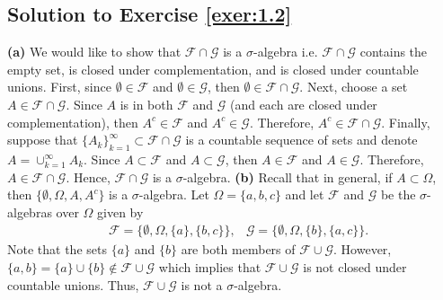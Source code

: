 \documentclass[12pt]{book}
\numberwithin{equation}{chapter}
\theoremstyle{plain}
\numberwithin{theorem}{section}
\theoremstyle{definition}
\numberwithin{exercise}{chapter}
\newcommand{\<}{\langle}
\renewcommand{\>}{\rangle}
\renewcommand{\(}{\left(}
\renewcommand{\)}{\right)}
\renewcommand{\[}{\left[}
\renewcommand{\]}{\right]}
\newcommand\Fc{\mathscr{F}}
\newcommand\Gc{\mathscr{G}}
\newcommand\Om{\Omega}
\newcommand\sig{\sigma}
\newcommand\es{\emptyset}
\begin{document}
\subsection*{Solution to Exercise \ref{exer:1.2}}
\textbf{(a)}
We would like to show that $\Fc \cap \Gc$ is a $\sig$-algebra i.e. $\Fc \cap \Gc$ contains the empty set, is closed under complementation, and is closed under countable unions. First, since $\emptyset \in \Fc$ and $\emptyset \in \Gc$, then $\emptyset \in \Fc \cap \Gc$. Next, choose a set $A \in \Fc \cap \Gc$. Since $A$ is in both $\Fc$ and $\Gc$ (and each are closed under complementation), then $A^c \in \Fc$ and $A^c \in \Gc$. Therefore, $A^c \in \Fc \cap \Gc$. Finally, suppose that $\{ A_k \}_{k=1}^\infty \subset \Fc \cap \Gc$ is a countable sequence of sets and denote $A = \cup_{k=1}^\infty A_k$. Since $A \subset \Fc$ and $A \subset \Gc$, then $A \in \Fc$ and $A \in \Gc$. Therefore, $A \in \Fc \cap \Gc$. Hence, $\Fc \cap \Gc$ is a $\sig$-algebra. 
\textbf{(b)}
Recall that in general, if $A \subset \Om$, then $\{ \es, \Om, A, A^c \}$ is a $\sig$-algebra. Let $\Om = \{ a, b , c \}$ and let $\Fc$ and $\Gc$ be the $\sig$-algebras over $\Om$ given by
\begin{align}
&\Fc
	= \{ \es, \Om, \{ a \}, \{ b, c \} \},
&\Gc
	= \{ \es, \Om, \{ b \}, \{ a, c \} \}.
\end{align}
Note that the sets $\{ a \}$ and $\{ b \}$ are both members of $\Fc \cup \Gc$. However, $\{ a, b\} = \{ a \} \cup \{ b \} \not\in \Fc \cup \Gc$ which implies that $\Fc \cup \Gc$ is not closed under countable unions. Thus, $\Fc \cup \Gc$ is not a $\sig$-algebra. 
\end{document}
